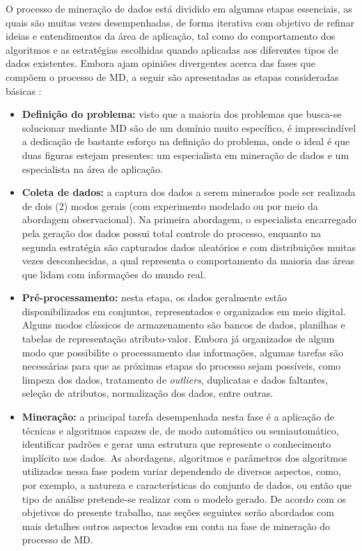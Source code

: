 O processo de mineração de dados está dividido em algumas etapas essenciais, as quais são muitas vezes desempenhadas, de forma iterativa com objetivo de refinar ideias e entendimentos da área de aplicação, tal como do comportamento dos algoritmos e as estratégias escolhidas quando aplicadas aos diferentes tipos de dados existentes. Embora ajam opiniões divergentes acerca das fases que compõem o processo de MD, a seguir são apresentadas as etapas consideradas básicas \cite{kantardzic2011, kurgan2006}:

\begin{itemize}
    \item \textbf{Definição do problema:} visto que a maioria dos problemas que busca-se solucionar mediante MD são de um domínio muito específico, é imprescindível a dedicação de bastante esforço na definição do problema, onde o ideal é que duas figuras estejam presentes: um especialista em mineração de dados e um especialista na área de aplicação.
    
    \item \textbf{Coleta de dados:} a captura dos dados a serem minerados pode ser realizada de dois (2) modos gerais (com experimento modelado ou por meio da abordagem observacional). Na primeira abordagem, o especialista encarregado pela geração dos dados possui total controle do processo, enquanto na segunda estratégia são capturados dados aleatórios e com distribuições muitas vezes desconhecidas, a qual representa o comportamento da maioria das áreas que lidam com informações do mundo real.
    
    \item \textbf{Pré-processamento:} nesta etapa, os dados geralmente estão disponibilizados em conjuntos, representados e organizados em meio digital. Alguns modos clássicos de armazenamento são bancos de dados, planilhas e tabelas de representação atributo-valor. Embora já organizados de algum modo que possibilite o processamento das informações, algumas tarefas são necessárias para que as próximas etapas do processo sejam possíveis, como limpeza dos dados, tratamento de \textit{outliers}, duplicatas e dados faltantes, seleção de atributos, normalização dos dados, entre outras.
    
    \item \textbf{Mineração:} a principal tarefa desempenhada nesta fase é a aplicação de técnicas e algoritmos capazes de, de modo automático ou semiautomático, identificar padrões e gerar uma estrutura que represente o conhecimento implícito nos dados. As abordagens, algoritmos e parâmetros dos algoritmos utilizados nessa fase podem variar dependendo de diversos aspectos, como, por exemplo, a natureza e características do conjunto de dados, ou então que tipo de análise pretende-se realizar com o modelo gerado. De acordo com os objetivos do presente trabalho, nas seções seguintes serão abordados com mais detalhes outros aspectos levados em conta na fase de mineração do processo de MD.
    

\end{itemize}
